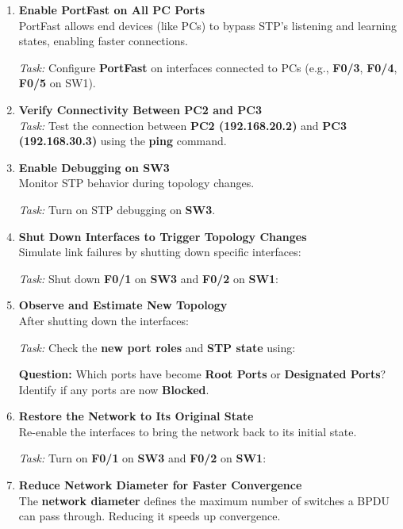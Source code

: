 \documentclass[a4paper]{book}
\begin{document}
\begin{enumerate}
    \item \textbf{Enable PortFast on All PC Ports} \\
    PortFast allows end devices (like PCs) to bypass STP's listening and learning states, enabling faster connections.

    \textit{Task:} Configure \textbf{PortFast} on interfaces connected to PCs (e.g., \textbf{F0/3}, \textbf{F0/4}, \textbf{F0/5} on SW1).

    \item \textbf{Verify Connectivity Between PC2 and PC3} \\
    \textit{Task:} Test the connection between \textbf{PC2 (192.168.20.2)} and \textbf{PC3 (192.168.30.3)} using the \textbf{ping} command.


    \item \textbf{Enable Debugging on SW3} \\
    Monitor STP behavior during topology changes.

    \textit{Task:} Turn on STP debugging on \textbf{SW3}.

    \item \textbf{Shut Down Interfaces to Trigger Topology Changes} \\
    Simulate link failures by shutting down specific interfaces:

    \textit{Task:} Shut down \textbf{F0/1} on \textbf{SW3} and \textbf{F0/2} on \textbf{SW1}:


    \item \textbf{Observe and Estimate New Topology} \\
    After shutting down the interfaces:

    \textit{Task:} Check the \textbf{new port roles} and \textbf{STP state} using:


    \textbf{Question:} Which ports have become \textbf{Root Ports} or \textbf{Designated Ports}? Identify if any ports are now \textbf{Blocked}.

    \item \textbf{Restore the Network to Its Original State} \\
    Re-enable the interfaces to bring the network back to its initial state.

    \textit{Task:}  Turn on \textbf{F0/1} on \textbf{SW3} and \textbf{F0/2} on \textbf{SW1}:


    \item \textbf{Reduce Network Diameter for Faster Convergence} \\
    The \textbf{network diameter} defines the maximum number of switches a BPDU can pass through. Reducing it speeds up convergence.


\end{enumerate}
\end{document}
